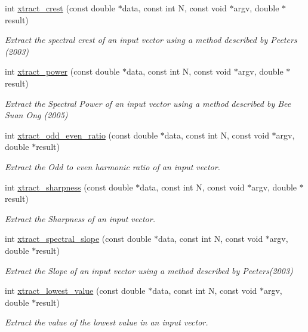 \begin{DoxyCompactItemize}
int \hyperlink{group__scalar_gaa80bf2a8e7be13046268fcb7cc31a91c}{xtract\-\_\-crest} (const double $\ast$data, const int N, const void $\ast$argv, double $\ast$result)
\begin{DoxyCompactList}\small\item\em Extract the spectral crest of an input vector using a method described by Peeters (2003) \end{DoxyCompactList}\item 
int \hyperlink{group__scalar_gab2c8bce67df39303c72f71bf6ce3a5e0}{xtract\-\_\-power} (const double $\ast$data, const int N, const void $\ast$argv, double $\ast$result)
\begin{DoxyCompactList}\small\item\em Extract the Spectral Power of an input vector using a method described by Bee Suan Ong (2005) \end{DoxyCompactList}\item 
int \hyperlink{group__scalar_ga3875083d83541594082e6e9588026a3e}{xtract\-\_\-odd\-\_\-even\-\_\-ratio} (const double $\ast$data, const int N, const void $\ast$argv, double $\ast$result)
\begin{DoxyCompactList}\small\item\em Extract the Odd to even harmonic ratio of an input vector. \end{DoxyCompactList}\item 
int \hyperlink{group__scalar_ga2e6a3f1195eff60b115824b32c1499da}{xtract\-\_\-sharpness} (const double $\ast$data, const int N, const void $\ast$argv, double $\ast$result)
\begin{DoxyCompactList}\small\item\em Extract the Sharpness of an input vector. \end{DoxyCompactList}\item 
int \hyperlink{group__scalar_ga5c771e7f492546523ab8cb7f72a4adf5}{xtract\-\_\-spectral\-\_\-slope} (const double $\ast$data, const int N, const void $\ast$argv, double $\ast$result)
\begin{DoxyCompactList}\small\item\em Extract the Slope of an input vector using a method described by Peeters(2003) \end{DoxyCompactList}\item 
int \hyperlink{group__scalar_ga7d31c6009b1641d6bf9d9352bd11f739}{xtract\-\_\-lowest\-\_\-value} (const double $\ast$data, const int N, const void $\ast$argv, double $\ast$result)
\begin{DoxyCompactList}\small\item\em Extract the value of the lowest value in an input vector. \end{DoxyCompactList}\item 

\end{DoxyCompactItemize}

